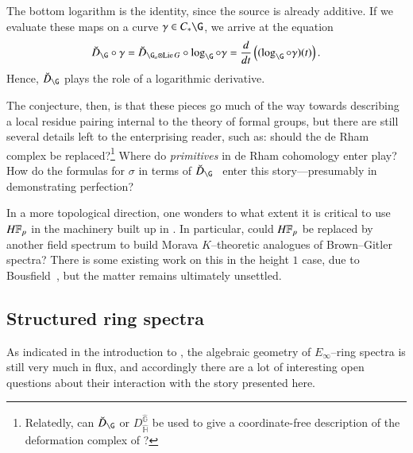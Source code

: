 \begin{enumerate}
    \begin{center}
    \end{center}
    The bottom logarithm is the identity, since the source is already additive.  If we evaluate these maps on a curve $\gamma \in C_* \G$, we arrive at the equation~\cite[V.8.5]{LazardCFGs} \[\breve D_{\G} \circ \gamma = \breve D_{\G_a \otimes \Lie G} \circ \log_{\G} \circ \gamma = \frac{d}{dt} \left( (\log_\G \circ \gamma)(t) \right).\]  Hence, $\breve D_{\G}$ plays the role of a logarithmic derivative.
\end{enumerate}

The conjecture, then, is that these pieces go much of the way towards describing a local residue pairing internal to the theory of formal groups, but there are still several details left to the enterprising reader, such as: should the de Rham complex be replaced?\footnote{Relatedly, can $\breve D_{\G}$ or $D_{\widehat{\mathbb H}}^{\widehat{\mathbb G}}$ be used to give a coordinate-free description of the deformation complex of ?}  Where do \emph{primitives} in de Rham cohomology enter play?  How do the formulas for $\sigma$ in terms of $\breve D_{\G}$~\cite[VII.6.14]{LazardCFGs} enter this story---presumably in demonstrating perfection?

In a more topological direction, one wonders to what extent it is critical to use $\HFp$ in the machinery built up in .  In particular, could $\HFp$ be replaced by another field spectrum to build Morava $K$--theoretic analogues of Brown--Gitler spectra?  There is some existing work on this in the height $1$ case, due to Bousfield~\cite{BousfieldLambdaRings}, but the matter remains ultimately unsettled.





\subsection*{Structured ring spectra}

As indicated in the introduction to , the algebraic geometry of $E_\infty$--ring spectra is still very much in flux, and accordingly there are a lot of interesting open questions about their interaction with the story presented here.

